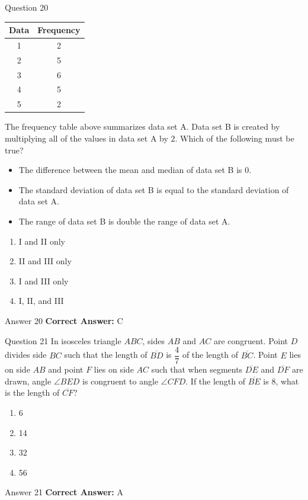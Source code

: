 \documentclass{beamer}
\begin{document}
\begin{frame}{Question 20}
\small
\begin{center}
\begin{tabular}{|c|c|}
\hline
\textbf{Data} & \textbf{Frequency}\\
\hline
1 & 2\\
2 & 5\\
3 & 6\\
4 & 5\\
5 & 2\\
\hline
\end{tabular}
\end{center}

The frequency table above summarizes data set A. 
Data set B is created by multiplying all of the values in data set A by $2$. 
Which of the following must be true?

\begin{itemize}
\item[I.] The difference between the mean and median of data set B is $0$.
\item[II.] The standard deviation of data set B is equal to the standard deviation of data set A.
\item[III.] The range of data set B is double the range of data set A.
\end{itemize}
\vspace{0.35cm}
\begin{enumerate}
    \item[A.] I and II only
    \item[B.] II and III only
    \item[C.] I and III only
    \item[D.] I, II, and III
\end{enumerate}
\end{frame}
\begin{frame}{Answer 20}
\small
\textbf{Correct Answer:} C
\end{frame}

\begin{frame}{Question 21}
\small
In isosceles triangle $ABC$, sides $AB$ and $AC$ are congruent. Point $D$ divides side $BC$ such that the length of $\overline{BD}$ is $\dfrac{4}{7}$ of the length of $\overline{BC}$. Point $E$ lies on side $AB$ and point $F$ lies on side $AC$ such that when segments $\overline{DE}$ and $\overline{DF}$ are drawn, angle $\angle BED$ is congruent to angle $\angle CFD$. If the length of $\overline{BE}$ is $8$, what is the length of $\overline{CF}$?
\vspace{0.35cm}
\begin{enumerate}
    \item[A.] 6
    \item[B.] 14
    \item[C.] 32
    \item[D.] 56
\end{enumerate}
\end{frame}
\begin{frame}{Answer 21}
\small
\textbf{Correct Answer:} A
\end{frame}
\end{document}
